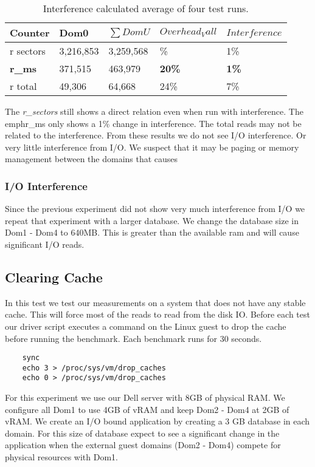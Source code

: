 \begin{table}[h]
\begin{tabular}{ l l l l p{5cm} }
  Counter & Dom0 & $\sum{DomU}$ & $Overhead_Vall$ & $Interference$ \\
  \hline
       r sectors & 3,216,853 & 3,259,568 & \%    & 1\%\\
  \textbf{r\_ms} & 371,515 & 463,979 & \textbf{20\%} & \textbf{1\%} \\
       r total   & 49,306 & 64,668 & 24\%  & 7\% \\
  \hline
\end{tabular}
\caption{Interference calculated average of four test runs.}
\label{fig:InterferenceSm}
\end{table}

The \emph{r\_sectors} still shows a direct relation even when run with interference.  The emph{r\_ms} only shows a 1\% change in interference.  The total reads may not be related to the interference.  From these results we do not see I/O interference.  Or very little interference from I/O.  We suspect that it may be paging or memory management between the domains that causes 

\subsubsection{I/O Interference}
Since the previous experiment did not show very much interference from I/O we repeat that experiment with a larger database.  We change the database size in Dom1 - Dom4 to 640MB.  This is greater than the available ram and will cause significant I/O reads.



\subsection{Clearing Cache}
In this test we test our measurements on a system that does not have any stable cache. This will force most of
the reads to read from the disk IO. Before each test our driver script executes a command on the Linux guest
to drop the cache before running the benchmark. Each benchmark runs for 30 seconds.

\begin{Verbatim}
    sync
    echo 3 > /proc/sys/vm/drop_caches
    echo 0 > /proc/sys/vm/drop_caches
\end{Verbatim}

\indent For this experiment we use our Dell server with 8GB of physical RAM. We configure all Dom1 to use
4GB of vRAM and keep Dom2 - Dom4 at 2GB of vRAM. We create an I/O bound application by creating a
3 GB database in each domain. For this size of database expect to see a significant change in the application
when the external guest domains (Dom2 - Dom4) compete for physical resources with Dom1.

